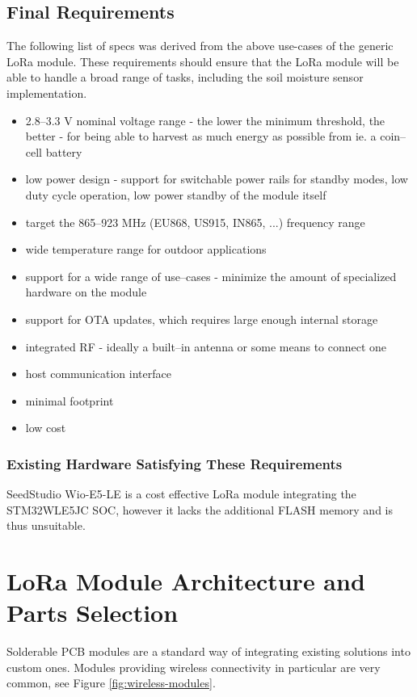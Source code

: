 \subsection{\label{section:final-requirements}Final Requirements}
The following list of specs was derived from the above use-cases of the generic LoRa module. These requirements should ensure that the LoRa module will be able to handle a broad range of tasks, including the soil moisture sensor implementation.
\begin{itemize}
    \item 2.8--3.3 V nominal voltage range - the lower the minimum threshold, the better - for being able to harvest as much energy as possible from ie. a coin--cell battery
    \item low power design - support for switchable power rails for standby modes, low duty cycle operation, low power standby of the module itself
    \item target the 865--923 MHz (EU868, US915, IN865, ...) frequency range
    \item wide temperature range for outdoor applications
    \item support for a wide range of use--cases - minimize the amount of specialized hardware on the module
    \item support for OTA updates, which requires large enough internal storage
    \item integrated RF - ideally a built--in antenna or some means to connect one
    \item host communication interface
    \item minimal footprint
    \item low cost
\end{itemize}

\subsubsection{Existing Hardware Satisfying These Requirements}
SeedStudio Wio-E5-LE \cite{stmicroelectronics_lora_2024, seeedstudio_wio-e5-wireless_2024} is a cost effective LoRa module integrating the STM32WLE5JC SOC, however it lacks the additional FLASH memory and is thus unsuitable.

\section{\label{section:module-architecture}LoRa Module Architecture and Parts Selection}
Solderable PCB modules are a standard way of integrating existing solutions into custom ones. Modules providing wireless connectivity in particular are very common, see Figure \ref{fig:wireless-modules}.

